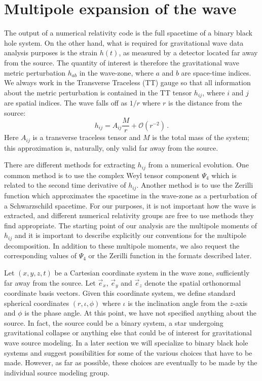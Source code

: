 \documentclass[prd,preprintnumbers,superscriptaddress,eqsecnum]{revtex4}
\numberwithin{equation}{section}
\newcommand{\xhat}{\vec{e}_x}
\newcommand{\yhat}{\vec{e}_y}
\newcommand{\zhat}{\vec{e}_z}
\begin{document}
\section{Multipole expansion of the wave}
\label{sec:multipoles}


The output of a numerical relativity code is the full spacetime of a
binary black hole system. On the other hand, what is required for
gravitational wave data analysis purposes is the strain $h(t)$, as
measured by a detector located far away from the source. The quantity
of interest is therefore the gravitational wave metric perturbation
$h_{ab}$ in the wave-zone, where $a$ and $b$ are space-time indices.
We always work in the Transverse Traceless (TT) gauge so that all
information about the metric perturbation is contained in the TT
tensor $h_{ij}$, where $i$ and $j$ are spatial indices. The wave
falls off as $1/r$ where $r$ is the distance from the source:
\begin{equation}
  \label{eq:1}
  h_{ij} = A_{ij}\frac{M}{r} + \mathcal{O}\left(r^{-2}\right)\,.
\end{equation}
Here $A_{ij}$ is a transverse traceless tensor and $M$ is the total
mass of the system; this approximation is, naturally, only valid far
away from the source.

There are different methods for extracting $h_{ij}$ from a numerical
evolution. One common method is to use the complex Weyl tensor
component $\Psi_4$ which is related to the second time derivative of
$h_{ij}$. Another method is to use the Zerilli function which
approximates the spacetime in the wave-zone as a perturbation of a
Schwarzschild spacetime. For our purposes, it is not important how
the wave is extracted, and different numerical relativity groups are
free to use methods they find appropriate. The starting point of our
analysis are the multipole moments of $h_{ij}$ and it is important to
describe explicitly our conventions for the multipole decomposition.
In addition to these multipole moments, we also request the
corresponding values of $\Psi_4$ or the Zerilli function in the
formats described later.

Let $(x,y,z,t)$ be a Cartesian coordinate system in the wave zone,
sufficiently far away from the source. Let $\xhat$, $\yhat$ and
$\zhat$ denote the spatial orthonormal coordinate basis vectors.
Given this coordinate system, we define standard spherical coordinates
$(r,\iota,\phi)$ where $\iota$ is the inclination angle from the
$z$-axis and $\phi$ is the phase angle. At this point, we have not
specified anything about the source. In fact, the source could be a
binary system, a star undergoing gravitational collapse or anything
else that could be of interest for gravitational wave source modeling.
In a later section we will specialize to binary black hole systems and
suggest possibilities for some of the various choices that have to be
made. However, as far as possible, these choices are eventually to be
made by the individual source modeling group.
\end{document}
